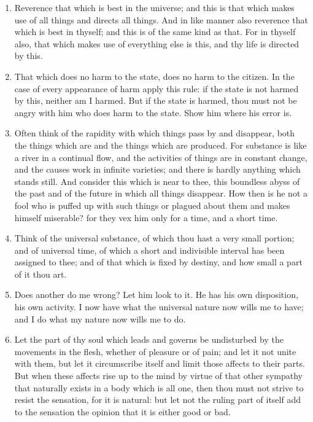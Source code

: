 \begin{enumerate}
\item Reverence that which is best in the universe; and this is that which makes use of all things and directs all things. And in like manner also reverence that which is best in thyself; and this is of the same kind as that. For in thyself also, that which makes use of everything else is this, and thy life is directed by this.

\item That which does no harm to the state, does no harm to the citizen. In the case of every appearance of harm apply this rule: if the state is not harmed by this, neither am I harmed. But if the state is harmed, thou must not be angry with him who does harm to the state. Show him where his error is.

\item Often think of the rapidity with which things pass by and disappear, both the things which are and the things which are produced. For substance is like a river in a continual flow, and the activities of things are in constant change, and the causes work in infinite varieties; and there is hardly anything which stands still. And consider this which is near to thee, this boundless abyss of the past and of the future in which all things disappear. How then is he not a fool who is puffed up with such things or plagued about them and makes himself miserable? for they vex him only for a time, and a short time.

\item Think of the universal substance, of which thou hast a very small portion; and of universal time, of which a short and indivisible interval has been assigned to thee; and of that which is fixed by destiny, and how small a part of it thou art.

\item Does another do me wrong? Let him look to it. He has his own disposition, his own activity. I now have what the universal nature now wills me to have; and I do what my nature now wills me to do.

\item Let the part of thy soul which leads and governs be undisturbed by the movements in the flesh, whether of pleasure or of pain; and let it not unite with them, but let it circumscribe itself and limit those affects to their parts. But when these affects rise up to the mind by virtue of that other sympathy that naturally exists in a body which is all one, then thou must not strive to resist the sensation, for it is natural: but let not the ruling part of itself add to the sensation the opinion that it is either good or bad.


\end{enumerate}
